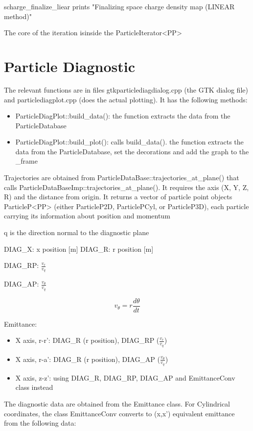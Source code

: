 \documentclass[12pt,a4paper]{article}
\begin{document}
scharge\_finalize\_liear prints "Finalizing space charge density map (LINEAR method)"

The core of the iteration isinside the ParticleIterator<PP>


\section{Particle Diagnostic}

The relevant functions are in files gtkparticlediagdialog.cpp (the GTK dialog file) and particlediagplot.cpp (does the actual plotting). It has the following methods:

\begin{itemize}
	\item ParticleDiagPlot::build\_data(): the function extracts the data from the ParticleDatabase
	\item ParticleDiagPlot::build\_plot(): calls build\_data(). the function extracts the data from the ParticleDatabase, set the decorations and add the graph to the \_frame
\end{itemize}


Trajectories are obtained from ParticleDataBase::trajectories\_at\_plane() that calls ParticleDataBaseImp::trajectories\_at\_plane(). It requires the axis (X, Y, Z, R) and the distance from origin. It returns a vector of particle point objects ParticleP<PP> (either ParticleP2D, ParticlePCyl, or ParticleP3D), each particle carrying its information about position and momentum

q is the direction normal to the diagnostic plane

DIAG\_X: x position [m]
DIAG\_R: r position [m]



DIAG\_RP: $\frac{v_r}{v_q}$

DIAG\_AP: $\frac{v_\theta}{v_q}$

$$v_\theta=r\frac{d\theta}{dt}$$

Emittance:
\begin{itemize}
	\item X axis, r-r': DIAG\_R (r position), DIAG\_RP ($\frac{v_r}{v_q}$)
	\item X axis, r-a': DIAG\_R (r position), DIAG\_AP ($\frac{v_\theta}{v_q}$)
	\item X axis, z-z': using DIAG\_R, DIAG\_RP, DIAG\_AP and EmittanceConv class instead
\end{itemize}


The diagnostic data are obtained from the Emittance class. For Cylindrical coordinates, the class EmittanceConv converts to (x,x') equivalent emittance from the following data:
\end{document}
